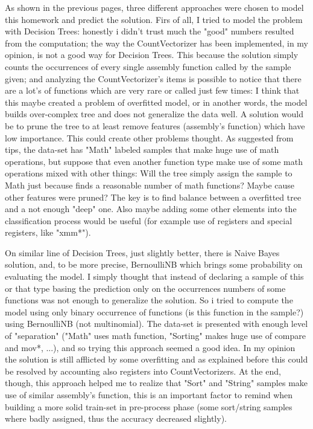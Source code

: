 \documentclass[11pt]{scrartcl}
\begin{document}
{{\noindent
As shown in the previous pages, three different approaches were chosen to model this homework and predict the solution.
Firs of all, I tried to model the problem with Decision Trees: honestly i didn't trust much the "good" numbers resulted from the computation; the way the CountVectorizer has been implemented, in my opinion, is not a good way for Decision Trees. This because the solution simply counts the occurrences of every single assembly function called by the sample given; and analyzing the CountVectorizer's items is possible to notice that there are a lot's of functions which are very rare or called just few times: I think that this maybe created a problem of overfitted model, or in another words, the model builds over-complex tree and does not generalize the data well. A solution would be to prune the tree to at least remove features (assembly's function) which have low importance. \newline
This could create other problems thought. As suggested from tips, the data-set has "Math" labeled samples that make huge use of math operations, but suppose that even another function type make use of some math operations mixed with other things: Will the tree simply assign the sample to Math
just because finds a reasonable number of math functions? Maybe cause other features were pruned? \newline
The key is to find balance between a overfitted tree and a not enough "deep" one. Also maybe adding some other elements into the classification process would be useful (for example use of registers and special registers, like "xmm*").
\newline

\noindent
On similar line of Decision Trees, just slightly better, there is Naive Bayes solution, and, to be more precise, BernoulliNB which brings some probability on evaluating the model.\newline
I simply thought that instead of declaring a sample of this or that type basing the prediction only on the occurrences numbers of some functions was not enough to generalize the solution. So i tried to compute the model using only binary occurrence of functions (is this function in the sample?) using BernoulliNB (not multinomial). The data-set is presented with enough level of "separation" ("Math" uses math function, "Sorting" makes huge use of compare and mov*, ...), and so trying this approach seemed a good idea. \newline
In my opinion the solution is still afflicted by some overfitting and as explained before this could be resolved by accounting also registers into CountVectorizers. At the end, though, this approach helped me to realize that "Sort" and "String" samples make use of similar assembly's function, this is an important factor to remind when building a more solid train-set in pre-process phase (some sort/string samples where badly assigned, thus the accuracy decreased slightly).
\newline 

}}
\end{document}
